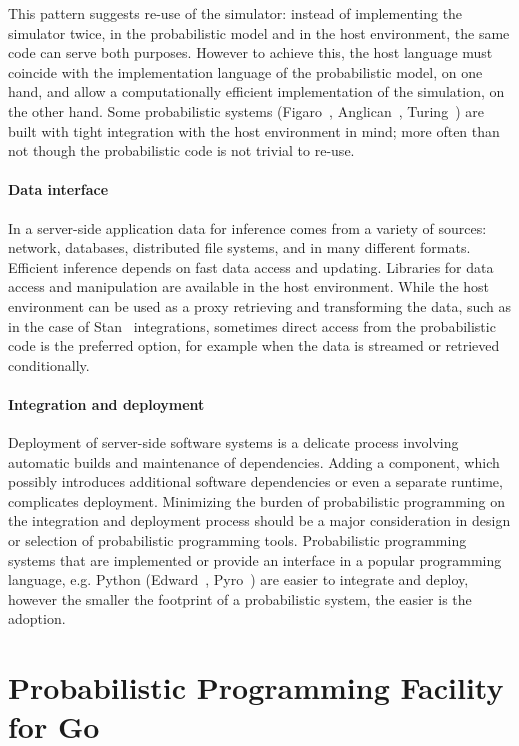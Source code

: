 \documentclass[sigplan,review]{acmart}\settopmatter{printfolios=true,printccs=false,printacmref=false}
\begin{document}
\begin{sloppypar}
This pattern suggests re-use of the simulator: instead of
implementing the simulator twice, in the probabilistic model and
in the host environment, the same code can serve both purposes.
However to achieve this, the host language must coincide with
the implementation language of the probabilistic model, on one
hand, and allow a computationally efficient implementation of
the simulation, on the other hand. Some probabilistic systems
(Figaro~\cite{P09}, Anglican~\cite{TMY+16}, Turing~\cite{GXG18})
are built with tight integration with the host environment in
mind; more often than not though the probabilistic code is
not trivial to re-use.

\paragraph{Data interface} In a server-side application data
for inference comes from a variety of sources: network,
databases, distributed file systems, and in many different
formats. Efficient inference depends on fast data access and
updating. Libraries for data access and manipulation are
available in the host environment. While the host environment
can be used as a proxy retrieving and transforming the data,
such as in the case of Stan~\cite{Stan17} integrations,
sometimes direct access from the probabilistic code is the
preferred option, for example when the data is streamed or
retrieved conditionally. 

\paragraph{Integration and deployment} Deployment of server-side
software systems is a delicate process involving automatic
builds and maintenance of dependencies. Adding  a component,
which possibly introduces additional software dependencies or
even a separate runtime, complicates deployment. Minimizing the
burden of probabilistic programming on the integration
and deployment process should be a major consideration in
design or selection of probabilistic programming tools.
Probabilistic programming systems that are implemented or 
provide an interface in a popular programming language, e.g.
Python (Edward~\cite{THS+17}, Pyro~\cite{Pyro18}) are easier
to integrate and deploy, however the smaller the footprint
of a probabilistic system, the easier is the adoption.

\section{Probabilistic Programming Facility for Go}


\end{sloppypar}
\end{document}
